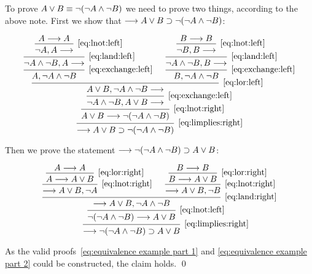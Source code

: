 \documentclass[11pt,a4paper]{article}
\begin{document}
\begin{exercise}
    To prove \(A\lor B\equiv \lnot(\lnot A\land\lnot B)\) we need to prove two things,
    according to the above note. First we show that
    \(\longrightarrow A\lor B\supset\lnot(\lnot A\land\lnot B)\):

\begin{equation}\label{eq:equivalence example part 1}
    \begin{prooftree}
        \hypo{A\seq A}
        \infer1[\eqref{eq:lnot:left}]{\lnot A, A\seq}
        \infer1[\eqref{eq:land:left}]{\lnot A\land\lnot B, A\seq}
        \infer1[\eqref{eq:exchange:left}]{A, \lnot A\land\lnot B}
        \hypo{B\seq B}
        \infer1[\eqref{eq:lnot:left}]{\lnot B, B\seq}
        \infer1[\eqref{eq:land:left}]{\lnot A\land\lnot B, B\seq}
        \infer1[\eqref{eq:exchange:left}]{B, \lnot A\land\lnot B}
        \infer2[\eqref{eq:lor:left}]{A\lor B, \lnot A \land\lnot B\seq}
        \infer1[\eqref{eq:exchange:left}]{\lnot A \land\lnot B, A\lor B\seq}
        \infer1[\eqref{eq:lnot:right}]{A\lor B \seq\lnot\arcs{\lnot A \land\lnot B}}
        \infer1[\eqref{eq:limplies:right}]{\seq A\lor B\limplies\lnot\arcs{\lnot A\land\lnot B}}
    \end{prooftree}
\end{equation}

Then we prove the statement \(\longrightarrow\lnot(\lnot A \land\lnot B) \supset A\lor B\):

\begin{equation}\label{eq:equivalence example part 2}
    \begin{prooftree}
        \hypo{A\seq A}
        \infer1[\eqref{eq:lor:right}]{A\seq A\lor B}
        \infer1[\eqref{eq:lnot:right}]{\seq A\lor B, \lnot A}
        \hypo{B\seq B}
        \infer1[\eqref{eq:lor:right}]{B\seq A\lor B}
        \infer1[\eqref{eq:lnot:right}]{\seq A\lor B, \lnot B}
        \infer2[\eqref{eq:land:right}]{\seq A\lor B, \lnot A\land\lnot B}
        \infer1[\eqref{eq:lnot:left}]{\lnot\arcs{\lnot A \land\lnot B}\seq A\lor B}
        \infer1[\eqref{eq:limplies:right}]{\seq\lnot\arcs{\lnot A \land\lnot B}\limplies A\lor B}
    \end{prooftree}
\end{equation}

As the valid proofs~\ref{eq:equivalence example part 1} and \ref{eq:equivalence example part 2}
could be constructed, the claim holds. \qed

\end{exercise}
\end{document}
